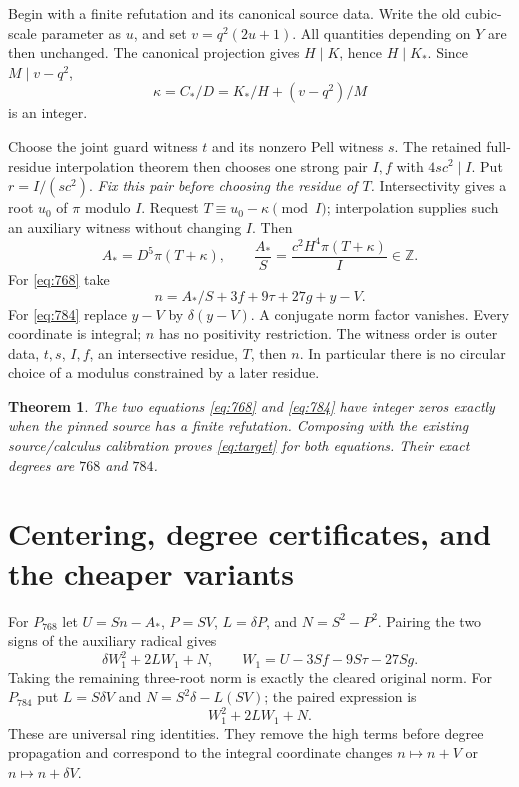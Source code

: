 \documentclass[11pt]{article}
\newcommand{\Z}{\mathbb Z}\newcommand{\N}{\mathbb N}
\newtheorem{theorem}{Theorem}[section]
\theoremstyle{definition}\newtheorem{definition}[theorem]{Definition}
\theoremstyle{remark}\newtheorem{remark}[theorem]{Remark}
\begin{document}
Begin with a finite refutation and its canonical source data. Write the
old cubic-scale parameter as $u$, and set $v=q^2(2u+1)$. All quantities
depending on $Y$ are then unchanged. The canonical projection gives
$H\mid K$, hence $H\mid K_*$. Since $M\mid v-q^2$,
\[
 \kappa=C_*/D=K_*/H+(v-q^2)/M
\]
is an integer.

Choose the joint guard witness $t$ and its nonzero Pell witness $s$.
The retained full-residue interpolation theorem then chooses one strong
pair $I,f$ with $4sc^2\mid I$. Put $r=I/(sc^2)$. \emph{Fix this pair
before choosing the residue of $T$.} Intersectivity gives a root $u_0$
of $\pi$ modulo $I$. Request $T\equiv u_0-\kappa\pmod I$; interpolation
supplies such an auxiliary witness without changing $I$. Then
\begin{equation}\label{eq:completequotient}
 A_*=D^5\pi(T+\kappa),\qquad
 \frac{A_*}{S}=\frac{c^2H^4\pi(T+\kappa)}I\in\Z.
\end{equation}
For \eqref{eq:768} take
\[
 n=A_*/S+3f+9\tau+27g+y-V.
\]
For \eqref{eq:784} replace $y-V$ by $\delta(y-V)$. A conjugate norm
factor vanishes. Every coordinate is integral; $n$ has no positivity
restriction. The witness order is outer data, $t,s$, $I,f$, an intersective
residue, $T$, then $n$. In particular there is no circular choice of a
modulus constrained by a later residue.

\begin{theorem}\label{thm:12}
The two equations \eqref{eq:768} and \eqref{eq:784} have integer zeros
exactly when the pinned source has a finite refutation. Composing with
the existing source/calculus calibration proves \eqref{eq:target} for
both equations. Their exact degrees are $768$ and $784$.
\end{theorem}

\section{Centering, degree certificates, and the cheaper variants}

For $P_{768}$ let $U=Sn-A_*$, $P=SV$, $L=\delta P$, and
$N=S^2-P^2$. Pairing the two signs of the auxiliary radical gives
\begin{equation}\label{eq:rationalpair}
 \delta W_1^2+2LW_1+N,\qquad
 W_1=U-3Sf-9S\tau-27Sg.
\end{equation}
Taking the remaining three-root norm is exactly the cleared original
norm. For $P_{784}$ put $L=S\delta V$ and
$N=S^2\delta-L(SV)$; the paired expression is
\begin{equation}\label{eq:integralpair}
 W_1^2+2LW_1+N.
\end{equation}
These are universal ring identities. They remove the high terms before
degree propagation and correspond to the integral coordinate changes
$n\mapsto n+V$ or $n\mapsto n+\delta V$.
\end{document}
